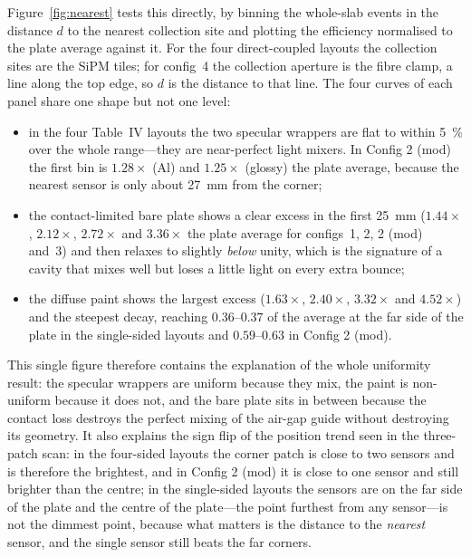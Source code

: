 \documentclass[11pt,a4paper]{article}
\begin{document}
Figure~\ref{fig:nearest} tests this directly, by binning the whole-slab
events in the distance $d$ to the nearest collection site and plotting the
efficiency normalised to the plate average against it. For the four
direct-coupled layouts the collection sites are the SiPM tiles; for config~4
the collection aperture is the fibre clamp, a line along the top edge, so $d$
is the distance to that line. The four curves of each panel share one shape
but not one level:
\begin{itemize}
  \item in the four Table~IV layouts the two specular wrappers are flat to
        within \SI{5}{\percent} over the whole range---they are near-perfect
        light mixers. In Config 2 (mod) the first bin is
        $1.28\times$ (Al) and $1.25\times$ (glossy) the plate average,
        because the nearest sensor is only about \SI{27}{\milli\meter} from
        the corner;
  \item the contact-limited bare plate shows a clear excess in the first
        \SI{25}{\milli\meter} ($1.44\times$, $2.12\times$, $2.72\times$ and
        $3.36\times$ the plate average for configs~1, 2, 2 (mod) and~3) and
        then relaxes to slightly \emph{below} unity, which is the signature
        of a cavity that mixes well but loses a little light on every extra
        bounce;
  \item the diffuse paint shows the largest excess ($1.63\times$,
        $2.40\times$, $3.32\times$ and $4.52\times$) and the steepest decay,
        reaching $0.36$--$0.37$ of the average at the far side of the plate
        in the single-sided layouts and $0.59$--$0.63$ in Config 2 (mod).
\end{itemize}
This single figure therefore contains the explanation of the whole uniformity
result: the specular wrappers are uniform because they mix, the paint is
non-uniform because it does not, and the bare plate sits in between because
the contact loss destroys the perfect mixing of the air-gap guide without
destroying its geometry. It also explains the sign flip of the position trend
seen in the three-patch scan: in the four-sided layouts the corner patch is
close to two sensors and is therefore the brightest, and in Config 2 (mod) it
is close to one sensor and still brighter than the centre; in the single-sided
layouts the sensors are on the far side of the plate and the centre of the
plate---the point furthest from any sensor---is not the dimmest point, because
what matters is the distance to the \emph{nearest} sensor, and the single
sensor still beats the far corners.
\end{document}
